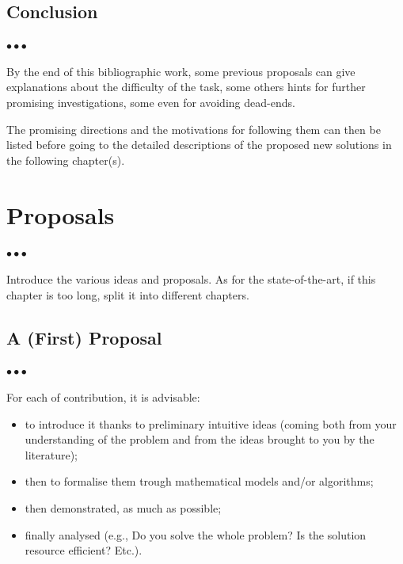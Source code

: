 \documentclass[11pt, english, screen, research-development]{report-rd-info}
\newenvironment{explanation}
{\color{blue}
 \begin{list}{}{\hspace{0.2\textwidth}\color{blue}}\item $\bullet\bullet\bullet$
}
{\end{list}}
\begin{document}
\section{Conclusion}

\begin{explanation}
   By the end of this bibliographic work, some previous proposals can give explanations about the difficulty of the task, some others hints for further promising investigations, some even for avoiding dead-ends.

   The promising directions and the motivations for following them can then be listed before going to the detailed descriptions of the proposed new solutions in the following chapter(s).
\end{explanation}



\chapter{Proposals}
\label{chap:Proposals}

\begin{explanation}
   Introduce the various ideas and proposals.
   As for the state-of-the-art, if this chapter is too long, split it into different chapters.
\end{explanation}

\section{A (First) Proposal}

\begin{explanation}
   For each of contribution, it is advisable:
   \begin{itemize}
      \item to introduce it thanks to preliminary intuitive ideas (coming both from your understanding of the problem and from the ideas brought to you by the literature);
      \item then to formalise them trough mathematical models and/or algorithms;
      \item then demonstrated, as much as possible;
      \item finally analysed (e.g., Do you solve the whole problem? Is the solution resource efficient? Etc.).
   \end{itemize}
\end{explanation}
\end{document}
